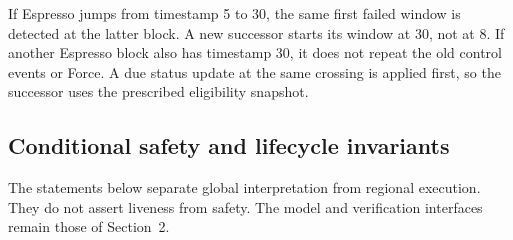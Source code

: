 \documentclass[11pt,a4paper]{article}
\begin{document}
If Espresso jumps from timestamp 5 to 30, the same first failed window
is detected at the latter block. A new successor starts its window at
30, not at 8. If another Espresso block also has timestamp 30, it does
not repeat the old control events or Force. A due status update at the
same crossing is applied first, so the successor uses the prescribed
eligibility snapshot.

\subsection{Conditional safety and lifecycle invariants}
\label{sec:safety-argument}
The statements below separate global interpretation from regional
execution. They do not assert liveness from safety. The model and
verification interfaces remain those of Section~2.
\end{document}
